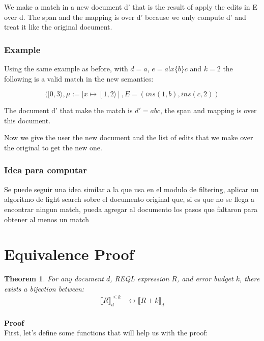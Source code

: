 \documentclass{article}
\newtheorem{theorem}{Theorem}
\begin{document}
We make a match in a new document d' that is the result of apply the edits in E over d. The span and the mapping is over d' because we only compute d' and treat it like the original document.

\subsubsection{Example}

Using the same example as before, with $d = a$, $e= a!x\{b\}c$ and $k = 2$ the following is a valid match in the new semantics:

\[([0, 3\rangle, \mu := [x \mapsto [1, 2\rangle], E = (ins(1, b), ins(c,2))\]

The document d' that make the  match is $d' = abc$, the span and mapping is over this document.

Now we give the user the new document and the list of edits that we make over the original to get the new one.

\subsubsection{Idea para computar}

Se puede seguir una idea similar a la que usa en el modulo de filtering, aplicar un algoritmo de light search sobre el documento original que, si es que no se llega a encontrar ningun match, pueda agregar al documento los pasos que faltaron para obtener al menos un match 

\section{Equivalence Proof}
\label{sec:equivalence}

\begin{theorem}
For any document $d$, REQL expression $R$, and error budget $k$, there exists a bijection between:
\begin{align*}
\llbracket R \rrbracket^{\leq k}_d &\leftrightarrow \llbracket R + k \rrbracket_d \\
\end{align*}

\end{theorem}

\textbf{Proof}\\

First, let's define some functions that will help us with the proof:\\
\end{document}
